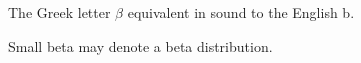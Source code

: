 The Greek letter $\beta$ 
equivalent in sound to the English b.
\par
Small beta may denote a beta distribution.